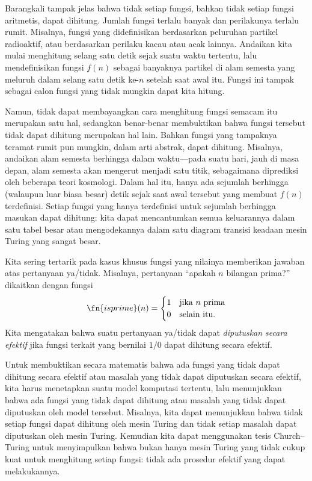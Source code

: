 \documentclass[../../../include/open-logic-section]{subfiles}
\begin{document}

Barangkali tampak jelas bahwa tidak setiap fungsi, bahkan tidak setiap fungsi
aritmetis, dapat dihitung. Jumlah fungsi terlalu banyak dan perilakunya terlalu
rumit. Misalnya, fungsi yang didefinisikan berdasarkan peluruhan partikel
radioaktif, atau berdasarkan perilaku kacau atau acak lainnya. Andaikan kita
mulai menghitung selang satu detik sejak suatu waktu tertentu, lalu
mendefinisikan fungsi $f(n)$ sebagai banyaknya partikel di alam semesta yang
meluruh dalam selang satu detik ke-$n$ setelah saat awal itu. Fungsi ini tampak
sebagai calon fungsi yang tidak mungkin dapat kita hitung.

Namun, tidak dapat membayangkan cara menghitung fungsi semacam itu merupakan
satu hal, sedangkan benar-benar membuktikan bahwa fungsi tersebut tidak dapat
dihitung merupakan hal lain. Bahkan fungsi yang tampaknya teramat rumit pun
mungkin, dalam arti abstrak, dapat dihitung. Misalnya, andaikan alam semesta
berhingga dalam waktu---pada suatu hari, jauh di masa depan, alam semesta akan
mengerut menjadi satu titik, sebagaimana diprediksi oleh beberapa teori
kosmologi. Dalam hal itu, hanya ada sejumlah berhingga (walaupun luar biasa
besar) detik sejak saat awal tersebut yang membuat $f(n)$ terdefinisi. Setiap
fungsi yang hanya terdefinisi untuk sejumlah berhingga masukan dapat dihitung:
kita dapat mencantumkan semua keluarannya dalam satu tabel besar atau
mengodekannya dalam satu diagram transisi keadaan mesin Turing yang sangat
besar.

Kita sering tertarik pada kasus khusus fungsi yang nilainya memberikan jawaban
atas pertanyaan ya/tidak. Misalnya, pertanyaan ``apakah $n$ bilangan prima?''
dikaitkan dengan fungsi
\[
\fn{isprime}(n) = \begin{cases}
  1 & \text{jika $n$ prima}\\
  0 & \text{selain itu.}
  \end{cases}
\]
Kita mengatakan bahwa suatu pertanyaan ya/tidak dapat \emph{diputuskan secara
efektif} jika fungsi terkait yang bernilai $1/0$ dapat dihitung secara efektif.

Untuk membuktikan secara matematis bahwa ada fungsi yang tidak dapat dihitung
secara efektif atau masalah yang tidak dapat diputuskan secara efektif, kita
harus menetapkan suatu model komputasi tertentu, lalu menunjukkan bahwa ada
fungsi yang tidak dapat dihitung atau masalah yang tidak dapat diputuskan oleh
model tersebut. Misalnya, kita dapat menunjukkan bahwa tidak setiap fungsi
dapat dihitung oleh mesin Turing dan tidak setiap masalah dapat diputuskan oleh
mesin Turing. Kemudian kita dapat menggunakan tesis Church--Turing untuk
menyimpulkan bahwa bukan hanya mesin Turing yang tidak cukup kuat untuk
menghitung setiap fungsi: tidak ada prosedur efektif yang dapat melakukannya.
\end{document}
